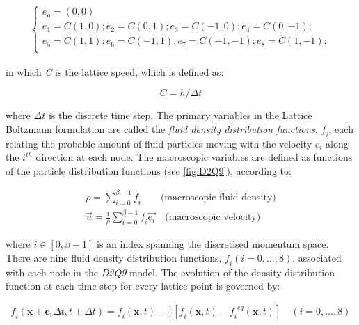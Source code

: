 \begin{align} 
	\begin{cases}
	\mathit{e_o}=(0,0)\\
	\mathit{e_1}=\mathit{C}(1,0); \mathit{e_2}=\mathit{C}(0,1); \mathit{e_3}=\mathit{C}(-1,0); \mathit{e_4}=\mathit{C}(0,-1); \\
	\mathit{e_5}=\mathit{C}(1,1); \mathit{e_6}=\mathit{C}(-1,1); \mathit{e_7}=\mathit{C}(-1,-1); \mathit{e_8}=\mathit{C}(1,-1); \\ 
	\end{cases}
\end{align}

in which \textit{C} is the lattice speed, which is defined as:

\begin{equation}
	\mathit{C}=\mathit{h}/\Delta t
\end{equation}

where $\Delta \mathit{t}$ is the discrete time step. The primary variables in 
the Lattice Boltzmann formulation are called the \textit{fluid density 
distribution functions}, $\mathit{f_i}$, each relating the probable amount of 
fluid particles moving with the velocity $\mathit{e_i}$ along the 
$\mathit{i^{th}}$ direction at each node. The macroscopic variables are defined 
as functions of the particle distribution functions (see \cref{fig:D2Q9}), 
according to:

\begin{align} 
 \nonumber
\rho = \sum\limits_{\mathit{i}=0}^{\beta - 1}{\mathit{f_i}} \qquad \mbox{(macroscopic fluid density)} \\
\overrightarrow{\mathit{u}} = \frac{1}{\rho} \sum\limits_{\mathit{i}=0}^{\beta -1}{\mathit{f_i}\overrightarrow{\mathit{e_i}}} \quad \mbox{(macroscopic velocity)}
\label{eq:lbm_macroscopic}
\end{align} 

where $\mathit{i} \in [0, \beta -1]$ is an index spanning the discretised 
momentum space. There are nine fluid density distribution functions, 
$\mathit{f_i}(\mathit{i}=0,\dots,8)$, associated with each node in the 
\textit{D2Q9} model. The evolution of the density distribution function at each 
time step for every lattice point is governed by:

\begin{align} 
\label{eq:stream}
\mathit{f_i}(\mathbf{x}+\mathbf{e}_{\mathit{i}} \Delta t, t + \Delta t) = \mathit{f_i}(\mathbf{x},t) - \frac{1}{\tau} [\mathit{f_i}(\mathbf{x},t) -\mathit{f_i}^{\mathit{eq}}(\mathbf{x},t)] \quad (\mathit{i}=0,\dots,8)
\end{align}

